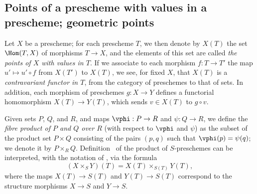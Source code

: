 \subsection{Points of a prescheme with values in a prescheme; geometric points}
\label{subsection:I.3.4}

\begin{env}[3.4.1]
\label{I.3.4.1}
Let $X$ be a prescheme; for each prescheme $T$, we then denote by $X(T)$ the set
$\Hom(T,X)$ of morphisms $T\to X$, and the elements of this set are called
\emph{the points of $X$ with values in $T$}. If we associate to each morphism
$f:T\to T'$ the map $u'\mapsto u'\circ f$ from $X(T')$ to $X(T)$, we see,
for fixed $X$, that $X(T)$ is a \emph{contravariant functor in $T$}, from the
category of preschemes to that of sets. In addition, each morphism of preschemes
$g:X\to Y$ defines a functorial homomorphism $X(T)\to Y(T)$, which sends
$v\in X(T)$ to $g\circ v$.
\end{env}

\begin{env}[3.4.2]
\label{I.3.4.2}
Given sets $P$, $Q$, and $R$, and maps $\vphi:P\to R$ and $\psi:Q\to R$, we define the
\emph{fibre product of $P$ and $Q$ over $R$} (with respect to $\vphi$ and $\psi$) as the subset
of
the product set $P\times Q$ consisting of the pairs $(p,q)$ such that $\vphi(p)=\psi(q)$; we
denote it by $P\times_R Q$. Definition~ of the product
of $S$-preschemes can be interpreted, with the notation of ,
via the formula
\[
\label{I.3.4.2.1}
  (X\times_S Y)(T)=X(T)\times_{S(T)}Y(T),
  \tag{3.4.2.1}
\]
where the maps $X(T)\to S(T)$ and $Y(T)\to S(T)$ correspond to the structure morphisms
$X\to S$ and $Y\to S$.
\end{env}

